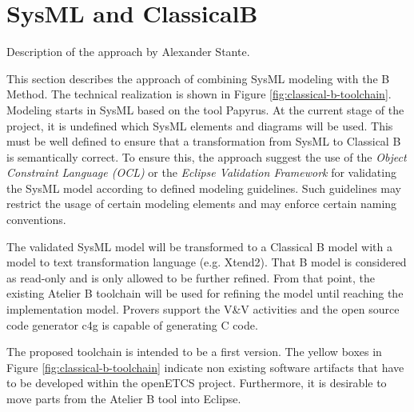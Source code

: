 \chapter{SysML and ClassicalB}
\label{sec:sysML-B}


\begin{todo_comment}
Description of the approach by Alexander Stante.
\end{todo_comment}

This section describes the approach of combining SysML modeling with
the B Method. The technical realization is shown in Figure
\ref{fig:classical-b-toolchain}. Modeling starts in SysML based on the
tool Papyrus. At the current stage of the project, it is undefined
which SysML elements and diagrams will be used. This must be well
defined to ensure that a transformation from SysML to Classical B is
semantically correct. To ensure this, the approach suggest the use of
the \emph{Object Constraint Language (OCL)} or the \emph{Eclipse
  Validation Framework} for validating the SysML model according to
defined modeling guidelines. Such guidelines may restrict the usage of
certain modeling elements and may enforce certain naming conventions.

The validated SysML model will be transformed to a Classical B model
with a model to text transformation language (e.g. Xtend2). That B
model is considered as read-only and is only allowed to be further
refined. From that point, the existing Atelier B toolchain will be
used for refining the model until reaching the implementation
model. Provers support the V\&V activities and the open source code
generator c4g is capable of generating C code.

The proposed toolchain is intended to be a first version. The yellow
boxes in Figure \ref{fig:classical-b-toolchain} indicate non existing
software artifacts that have to be developed within the openETCS
project. Furthermore, it is desirable to move parts from the Atelier B
tool into Eclipse. 

